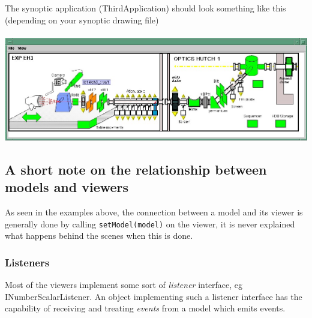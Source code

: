 The synoptic application (ThirdApplication) should
look something like this (depending on your synoptic drawing file)\\
\\
\includegraphics[scale=0.4]{atk/img/prog_guide_exple3}


\subsection{A short note on the relationship between models and viewers}

As seen in the examples above, the connection between a model
and its viewer is generally done by calling \texttt{setModel(model)}
on the viewer, it is never explained what happens behind
the scenes when this is done.


\subsubsection{Listeners}

Most of the viewers implement some sort of \emph{listener}
interface, eg INumberScalarListener.
An object implementing such a listener interface has the capability
of receiving and treating \emph{events} from a model
which emits events.

